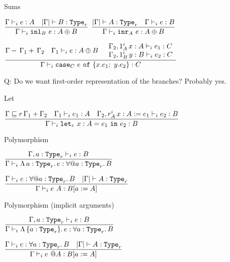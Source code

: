 \begin{frame}{Sums}

\begin{center}
  $\infrule{\typing[\Gamma]{e}{A} \quad \type[\cartesianize{\Gamma}]{B}[r]}{\typing[\Gamma]{\inl[B]{e}}{\Sum{A}{B}}}$ \quad
  $\infrule{\type[\cartesianize{\Gamma}]{A}[r] \quad \typing[\Gamma]{e}{B}}{\typing[\Gamma]{\inr[A]{e}}{\Sum{A}{B}}}$

  \vspace{2em}

  $\infrule{\decomposectx{\Gamma}{\Gamma_1}{\Gamma_2} \quad \typing[\Gamma_1]{e}{\Sum{A}{B}} \quad \begin{array}{l} \typing[\extend{\Gamma_2}[\totalqty{\One}{A}]{x}{A}]{e_1}{C} \\ \typing[\extend{\Gamma_2}[\totalqty{\One}{B}]{y}{B}]{e_2}{C} \end{array}}{\typing[\Gamma]{\newcase{e}{x}{e_1}{y}{e_2}[C]}{C}}$
\end{center}

\vspace{2em}

Q: Do we want first-order representation of the branches? Probably yes.

\end{frame}

\begin{frame}{Let}

\begin{center}
  $\infrule{\subusagectx{\Gamma}{\addctx{\scalectx{r}{\Gamma_1}}{\Gamma_2}} \quad \typing[\Gamma_1]{e_1}{A} \quad \typing[\extend{\Gamma_2}[\totalqty{r}{A}]{x}{A}[e_1]]{e_2}{B}}{\typing[\Gamma]{\letin[r]{x}[A]{e_1}{e_2}}{B}}$
\end{center}

\end{frame}

\begin{frame}{Polymorphism}

\begin{center}
  $\infrule{\typing[\extendtype{\Gamma}{a}[r]]{e}{B}}{\typing{\tfun{a}[r]{e}}{\ForallE{a}[r]{B}}}$

  \vspace{2em}

  $\infrule{\typing{e}{\ForallE{a}[r]{B}} \quad \type[\cartesianize{\Gamma}]{A}[r]}{\typing{\tapp{e}{A}}{\subst{B}{a}{A}}}$
\end{center}

\end{frame}

\begin{frame}{Polymorphism (implicit arguments)}

\begin{center}
  $\infrule{\typing[\extendtype{\Gamma}{a}[r]]{e}{B}}{\typing{\itfun{a}[r]{e}}{\ForallI{a}[r]{B}}}$

  \vspace{2em}

  $\infrule{\typing{e}{\ForallI{a}[r]{B}} \quad \type[\cartesianize{\Gamma}]{A}[r]}{\typing{\itapp{e}{A}}{\subst{B}{a}{A}}}$
\end{center}

\end{frame}